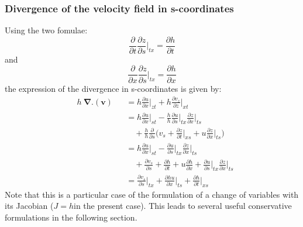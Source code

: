 \subsubsection{Divergence of the velocity field in s-coordinates}
Using the two fomulae:
\begin{equation}
 \displaystyle
 \frac{\partial}{\partial t} \frac{\partial z}{\partial s}\bigg\vert_{tx}= \frac{\partial h}{\partial t}
\end{equation}
and
\begin{equation}
 \displaystyle
 \frac{\partial}{\partial x} \frac{\partial z}{\partial s}\bigg\vert_{tx}= \frac{\partial h}{\partial x}
\end{equation}
%
the expression of the divergence in s-coordinates is given by:
\begin{subequations}
  \begin{alignat}{2}
  & h \ \mathbf{\nabla}.( \mathbf v) &&= h \frac{\partial u}{\partial x} \bigg \rvert_{zt} +h \frac{\partial v_z}{\partial z} \bigg \rvert_{xt}\\ 
  & && = h \frac{\partial u}{\partial x} \bigg \rvert_{st} - \frac{h}{h} \frac{\partial u}{\partial s}\bigg \rvert_{tx} \frac{\partial z}{\partial x}\bigg \rvert_{ts} \\
  & && \quad + \frac{h}{h}  \frac{\partial}{\partial s} \bigg ( v_s + \frac{\partial z }{\partial t}\bigg \rvert_{xs} + u \frac{\partial z}{\partial x}\bigg \rvert_{ts} \bigg )\\
  & && = h \frac{\partial u}{\partial x} \bigg \rvert_{st} -  \frac{\partial u}{\partial s}\bigg \rvert_{tx} \frac{\partial z}{\partial x}\bigg \rvert_{ts} \\
  & && \quad +  \frac{\partial v_s}{\partial s} +  \frac{\partial h}{\partial t} + u \frac{\partial h}{\partial x} + \frac{\partial u}{\partial s}\bigg \rvert_{tx} \frac{\partial z}{\partial x}\bigg \rvert_{ts}\\
  & && = \frac{\partial v_s}{\partial s}\bigg \rvert_{tx} + \frac{\partial h u}{\partial x} \bigg \rvert_{ts}+ \frac{\partial h}{\partial t}\bigg \rvert_{xs}
  \end{alignat}
\end{subequations}
Note that this is a particular case of the formulation of a change of variables with its Jacobian ($J=h$in the present case). This leads to several useful conservative formulations in the following section.
%

